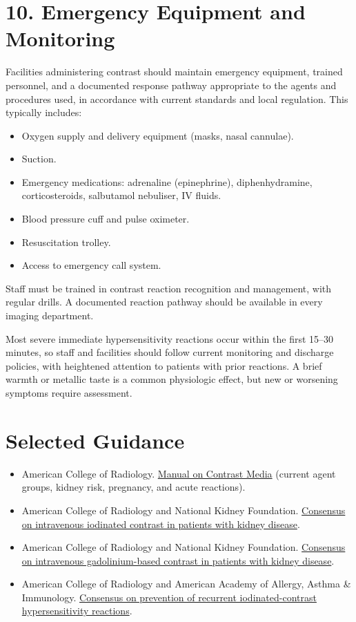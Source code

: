 \section*{10. Emergency Equipment and Monitoring}
Facilities administering contrast should maintain emergency equipment, trained personnel, and a documented response pathway appropriate to the agents and procedures used, in accordance with current standards and local regulation. This typically includes:
\begin{itemize}
    \item Oxygen supply and delivery equipment (masks, nasal cannulae).
    \item Suction.
    \item Emergency medications: adrenaline (epinephrine), diphenhydramine, corticosteroids, salbutamol nebuliser, IV fluids.
    \item Blood pressure cuff and pulse oximeter.
    \item Resuscitation trolley.
    \item Access to emergency call system.
\end{itemize}

Staff must be trained in contrast reaction recognition and management, with regular drills. A documented reaction pathway should be available in every imaging department.

\begin{pearlbox}
Most severe immediate hypersensitivity reactions occur within the first 15--30 minutes, so staff and facilities should follow current monitoring and discharge policies, with heightened attention to patients with prior reactions. A brief warmth or metallic taste is a common physiologic effect, but new or worsening symptoms require assessment.
\end{pearlbox}

\section*{Selected Guidance}
\begin{itemize}
    \item American College of Radiology. \href{https://www.acr.org/Clinical-Resources/Clinical-Tools-and-Reference/Contrast-Manual}{Manual on Contrast Media} (current agent groups, kidney risk, pregnancy, and acute reactions).
    \item American College of Radiology and National Kidney Foundation. \href{https://doi.org/10.1148/radiol.2019192094}{Consensus on intravenous iodinated contrast in patients with kidney disease}.
    \item American College of Radiology and National Kidney Foundation. \href{https://doi.org/10.1148/radiol.2020202903}{Consensus on intravenous gadolinium-based contrast in patients with kidney disease}.
    \item American College of Radiology and American Academy of Allergy, Asthma \& Immunology. \href{https://doi.org/10.1148/radiol.240100}{Consensus on prevention of recurrent iodinated-contrast hypersensitivity reactions}.
\end{itemize}

\clearpage
